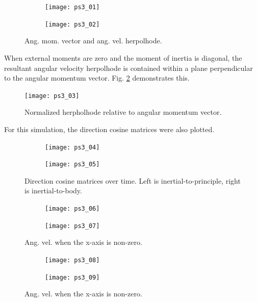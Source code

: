 \documentclass[12pt, letterpaper]{article}
\begin{document}
\begin{figure}[H]
	\centering
	\begin{subfigure}[b]{0.49\textwidth}
		\texttt{[image: ps3\_01]}
	\end{subfigure}
	\begin{subfigure}[b]{0.49\textwidth}
		\texttt{[image: ps3\_02]}
	\end{subfigure}
	\caption{Ang. mom. vector and ang. vel. herpolhode.}
	\label{3:herpolhode}
\end{figure}

When external moments are zero and the moment of inertia is diagonal, the resultant angular velocity herpolhode is contained within a plane perpendicular to the angular momentum vector. Fig. \ref{3:normHerpol} demonstrates this.

\begin{figure}[H]
	\centering
	\texttt{[image: ps3\_03]}
	\caption{Normalized herpholhode relative to angular momentum vector.}
	\label{3:normHerpol}
\end{figure}

For this simulation, the direction cosine matrices were also plotted.

\begin{figure}[H]
	\centering
	\begin{subfigure}[b]{0.49\textwidth}
		\texttt{[image: ps3\_04]}
	\end{subfigure}
	\begin{subfigure}[b]{0.49\textwidth}
		\texttt{[image: ps3\_05]}
	\end{subfigure}
	\caption{Direction cosine matrices over time. Left is inertial-to-principle, right is inertial-to-body.}
	\label{3:dcmplot}
\end{figure}


\begin{figure}[H]
	\centering
	\begin{subfigure}[b]{0.49\textwidth}
		\texttt{[image: ps3\_06]}
	\end{subfigure}
	\begin{subfigure}[b]{0.49\textwidth}
		\texttt{[image: ps3\_07]}
	\end{subfigure}
	\caption{Ang. vel. when the x-axis is non-zero.}
	\label{(4:xangvel1)}
\end{figure}


\begin{figure}[H]
	\centering
	\begin{subfigure}[b]{0.49\textwidth}
		\texttt{[image: ps3\_08]}
	\end{subfigure}
	\begin{subfigure}[b]{0.49\textwidth}
		\texttt{[image: ps3\_09]}
	\end{subfigure}
	\caption{Ang. vel. when the x-axis is non-zero.}
	\label{(4:xangvel1)}
\end{figure}
\end{document}
